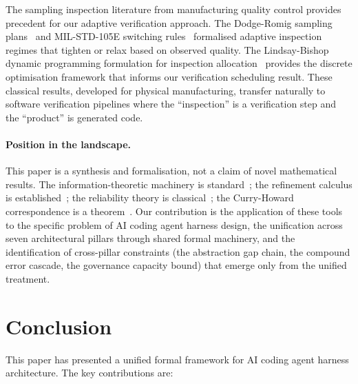 \documentclass[11pt, a4paper, logo, copyright]{googledeepmind}
\begin{document}
The sampling inspection literature from manufacturing quality control provides precedent for our adaptive verification approach. The Dodge-Romig sampling plans~\citep{dodge1929method, dodge1959sampling} and MIL-STD-105E switching rules~\citep{milstd105e} formalised adaptive inspection regimes that tighten or relax based on observed quality. The Lindsay-Bishop dynamic programming formulation for inspection allocation~\citep{lindsay1964allocation} provides the discrete optimisation framework that informs our verification scheduling result. These classical results, developed for physical manufacturing, transfer naturally to software verification pipelines where the ``inspection'' is a verification step and the ``product'' is generated code.

\paragraph{Position in the landscape.}
This paper is a synthesis and formalisation, not a claim of novel mathematical results. The information-theoretic machinery is standard~\citep{li2019introduction}; the refinement calculus is established~\citep{back1980correctness, morgan1994programming}; the reliability theory is classical~\citep{barlow1965mathematical}; the Curry-Howard correspondence is a theorem~\citep{wadler2015propositions}. Our contribution is the application of these tools to the specific problem of AI coding agent harness design, the unification across seven architectural pillars through shared formal machinery, and the identification of cross-pillar constraints (the abstraction gap chain, the compound error cascade, the governance capacity bound) that emerge only from the unified treatment.
\section{Conclusion}
\label{sec:conclusion}

This paper has presented a unified formal framework for AI coding agent harness architecture. The key contributions are:
\end{document}
